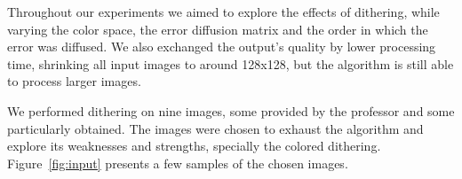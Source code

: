 \documentclass[conference]{IEEEtran}
\begin{document}
Throughout our experiments we aimed to explore the effects of dithering, while varying the color space, the error diffusion matrix and the order in which the error was diffused. We also exchanged the output's quality by lower processing time, shrinking all input images to around 128x128, but the algorithm is still able to process larger images.

We performed dithering on {\color{red}nine} images, some provided by the professor and some particularly obtained. The images were chosen to exhaust the algorithm and explore its weaknesses and strengths, specially the colored dithering. Figure~\ref{fig:input} presents a few samples of the chosen images.

\begin{figure}[H]
\centering
{}
\quad
{}
\end{figure}
\end{document}
